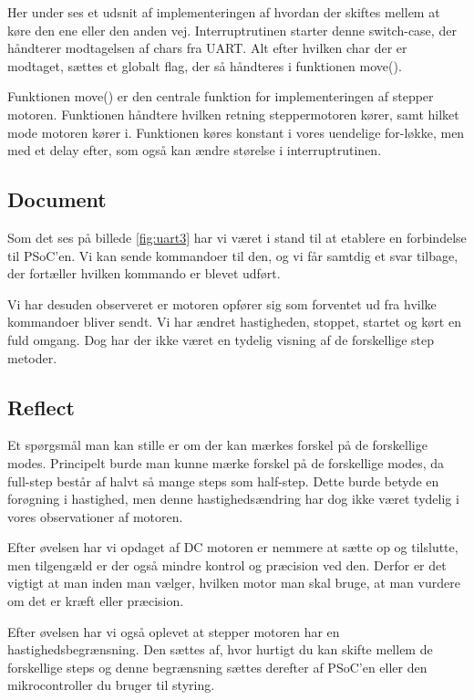 \documentclass[../main.tex]{subfiles}
\begin{document}
Her under ses et udsnit af implementeringen af hvordan der skiftes mellem at køre den ene eller den anden vej. Interruptrutinen starter denne switch-case, der håndterer modtagelsen af chars fra UART. Alt efter hvilken char der er modtaget, sættes et globalt flag, der så håndteres i funktionen move().

    

Funktionen move() er den centrale funktion for implementeringen af stepper motoren. Funktionen håndtere hvilken retning steppermotoren kører, samt hilket mode motoren kører i. Funktionen køres konstant i vores uendelige for-løkke, men med et delay efter, som også kan ændre størelse i interruptrutinen.

    

\subsection{Document}

Som det ses på billede \ref{fig:uart3} har vi været i stand til at etablere en forbindelse til PSoC'en. Vi kan sende kommandoer til den, og vi får samtdig et svar tilbage, der fortæller hvilken kommando er blevet udført.


Vi har desuden observeret er motoren opfører sig som forventet ud fra hvilke kommandoer bliver sendt. Vi har ændret hastigheden, stoppet, startet og kørt en fuld omgang. Dog har der ikke været en tydelig visning af de forskellige step metoder.

\subsection{Reflect}
Et spørgsmål man kan stille er om der kan mærkes forskel på de forskellige modes.
Principelt burde man kunne mærke forskel på de forskellige modes, da full-step består af halvt så mange steps som half-step. 
Dette burde betyde en forøgning i hastighed, men denne hastighedsændring har dog ikke været tydelig i vores observationer af motoren.

Efter øvelsen har vi opdaget af DC motoren er nemmere at sætte op og tilslutte, men tilgengæld er der også mindre kontrol og præcision ved den.
Derfor er det vigtigt at man inden man vælger, hvilken motor man skal bruge, at man vurdere om det er kræft eller præcision.

Efter øvelsen har vi også oplevet at stepper motoren har en hastighedsbegrænsning.
Den sættes af, hvor hurtigt du kan skifte mellem de forskellige steps og denne begrænsning sættes derefter af PSoC'en eller den mikrocontroller du bruger til styring.
\end{document}
